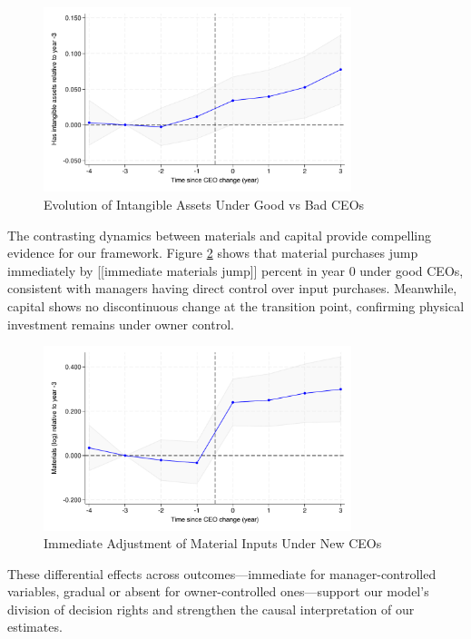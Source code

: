 \documentclass[11pt,a4paper]{article}
\begin{document}
\begin{figure}[htbp]
\centering
\includegraphics[width=0.8\textwidth]{figure/event_study_has_intangible.pdf}
\caption{Evolution of Intangible Assets Under Good vs Bad CEOs}
\label{fig:intangibles}
\end{figure}

The contrasting dynamics between materials and capital provide compelling evidence for our framework. Figure \ref{fig:materials} shows that material purchases jump immediately by [[immediate materials jump]] percent in year 0 under good CEOs, consistent with managers having direct control over input purchases. Meanwhile, capital shows no discontinuous change at the transition point, confirming physical investment remains under owner control.

\begin{figure}[htbp]
\centering
\includegraphics[width=0.8\textwidth]{figure/event_study_lnM.pdf}
\caption{Immediate Adjustment of Material Inputs Under New CEOs}
\label{fig:materials}
\end{figure}

These differential effects across outcomes—immediate for manager-controlled variables, gradual or absent for owner-controlled ones—support our model's division of decision rights and strengthen the causal interpretation of our estimates.
\end{document}
